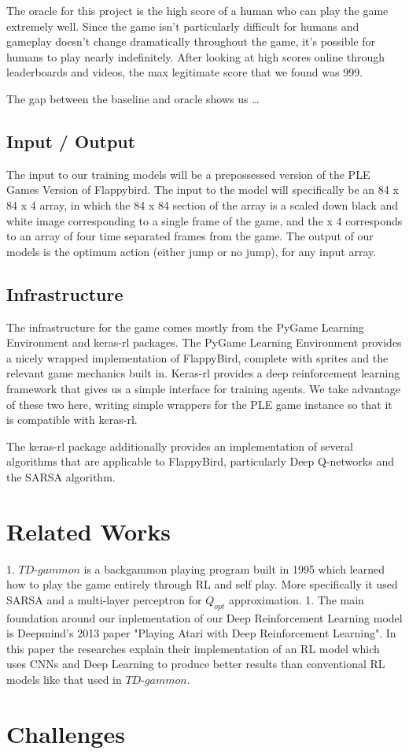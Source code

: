\documentclass{article}
\begin{document}
The oracle for this project is the high score of a human who can play the game extremely well.
Since the game isn't particularly difficult for humans and gameplay doesn't change dramatically throughout the game, it's possible for humans to play nearly indefinitely.
After looking at high scores online through leaderboards and videos, the max legitimate score that we found was 999. 

The gap between the baseline and oracle shows us \dots
\subsection{Input / Output}
The input to our training models will be a prepossessed version of the PLE Games Version of Flappybird. 
The input to the model will specifically be an 84 x 84 x 4 array, in which the 84 x 84 section of the array is a scaled down black and white image corresponding to a single frame of the game, and the x 4 corresponds to an array of four time separated frames from the game. 
The output of our models is the optimum action (either jump or no jump), for any input array. 

\subsection{Infrastructure}

The infrastructure for the game comes mostly from the PyGame Learning Environment and keras-rl packages. 
The PyGame Learning Environment provides a nicely wrapped implementation of FlappyBird, complete with sprites and the relevant game mechanics built in. 
Keras-rl provides a deep reinforcement learning framework that gives us a simple interface for training agents. 
We take advantage of these two here, writing simple wrappers for the PLE game instance so that it is compatible with keras-rl.

The keras-rl package additionally provides an implementation of several algorithms that are applicable to FlappyBird, particularly Deep Q-networks and the SARSA algorithm. 

\section{Related Works}
1. $\textit{TD-gammon}$ is a backgammon playing program built in 1995 which learned how to play the game entirely through RL and self play. 
More specifically it used SARSA and a multi-layer perceptron for $Q_{opt}$ approximation.
1. The main foundation around our inplementation of our Deep Reinforcement Learning model is Deepmind's 2013 paper "Playing Atari with Deep Reinforcement Learning". 
In this paper the researches explain their implementation of an RL model which uses CNNs and Deep Learning to produce better results than conventional RL models like that used in $\textit{TD-gammon}$. \cite{einstein}

\section{Challenges}



\end{document}
